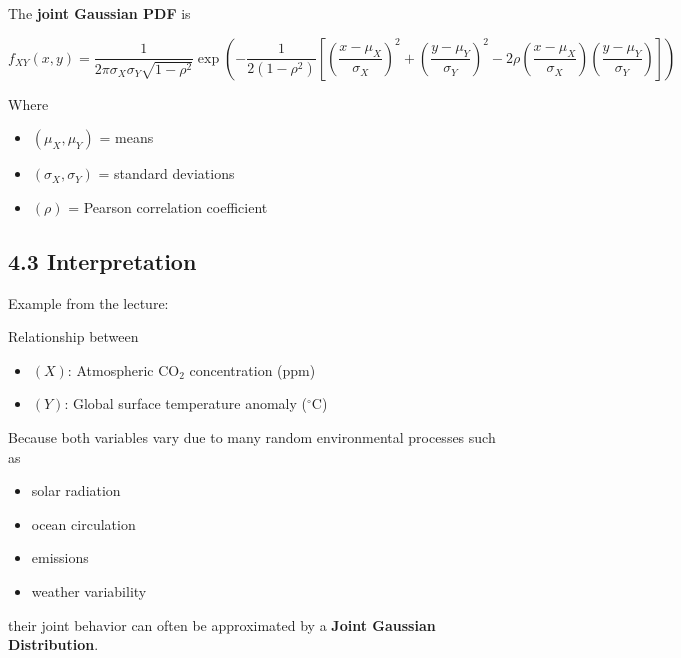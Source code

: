 \documentclass[12pt]{article}
\begin{document}
The \textbf{joint Gaussian PDF} is

\[
f_{XY}(x,y)=
\frac{1}{2\pi\sigma_X\sigma_Y\sqrt{1-\rho^2}}
\exp
\left(
-\frac{1}{2(1-\rho^2)}
\left[
\left(\frac{x-\mu_X}{\sigma_X}\right)^2
+
\left(\frac{y-\mu_Y}{\sigma_Y}\right)^2
-
2\rho
\left(\frac{x-\mu_X}{\sigma_X}\right)
\left(\frac{y-\mu_Y}{\sigma_Y}\right)
\right]
\right)
\]

Where

\begin{itemize}
\item $( \mu_X, \mu_Y )$ = means
\item $( \sigma_X, \sigma_Y )$ = standard deviations
\item $( \rho )$ = Pearson correlation coefficient
\end{itemize}

\subsection*{4.3 Interpretation}

Example from the lecture:

Relationship between

\begin{itemize}
\item $(X)$: Atmospheric CO$_2$ concentration (ppm)
\item $(Y)$: Global surface temperature anomaly ($^\circ$C)
\end{itemize}

Because both variables vary due to many random environmental processes such as

\begin{itemize}
\item solar radiation
\item ocean circulation
\item emissions
\item weather variability
\end{itemize}

their joint behavior can often be approximated by a \textbf{Joint Gaussian Distribution}.
\end{document}
